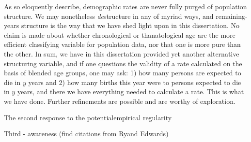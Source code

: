 As \citet{stolnitz1949recent} so eloquently describe, demographic rates are
never fully purged of population structure. We may nonetheless \textit{de}structure in
any of myriad ways, and remaining-years structure is the way that we have shed
light upon in this dissertation. No claim is made about whether chronological or
thanatological age are the more efficient classifying variable for population
data, nor that one is more pure than the other. In sum, we have in this
dissertation provided yet another alternative structuring variable, and if one
questions the validity of a rate calculated on the basis of blended age groups,
one may ask: 1) how many persons are expected to die in $y$ years and 2) how
many births this year were to persons expected to die in $y$ years, and there we
have everything needed to calculate a rate. This is what we have done. Further
refinements are possible and are worthy of exploration.

The second response to the potentialempirical regularity

Third - awareness (find citations from Ryand Edwards)


